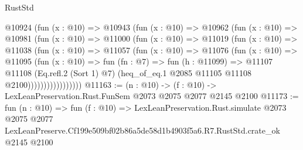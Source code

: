 \begin{lexlean}{RustStd}
\begin{coremodule}
              @10924
                (fun (x : @10) =>
                @10943
                  (fun (x : @10) =>
                  @10962
                    (fun (x : @10) =>
                    @10981
                      (fun (x : @10) =>
                      @11000
                        (fun (x : @10) =>
                        @11019
                          (fun (x : @10) =>
                          @11038
                            (fun (x : @10) =>
                            @11057
                              (fun (x : @10) =>
                              @11076
                                (fun (x : @10) =>
                                @11095
                                  (fun (x : @10) =>
                                  fun (fn : @7) =>
                                  fun (h : @11099) =>
                                  @11107
                                    @11108
                                    (Eq.refl.{2} (Sort 1) @7)
                                    (heq_of_eq.{1} @2085 @11105 @11108 @2100)))))))))))))))))
@11163 := (n : @10) -> (f : @10) -> LexLeanPreservation.Rust.FunSem @2073 @2075 @2077 @2145 @2100
@11173 := fun (n : @10) =>
  fun (f : @10) =>
  LexLeanPreservation.Rust.simulate
    @2073
    @2075
    @2077
    LexLeanPreserve.Cf199e509bf02b86a5de58d1b4903f5a6.R7.RustStd.crate_ok
    @2145
    @2100
\end{coremodule}
\end{lexlean}
